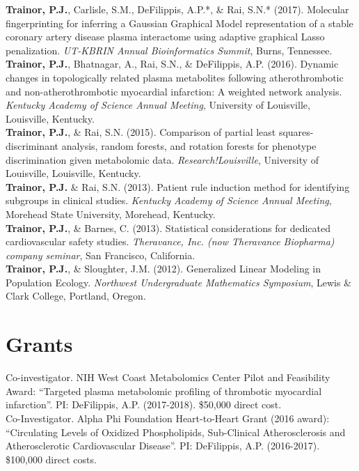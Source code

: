 {\textbf{Trainor, P.J.}, Carlisle, S.M., DeFilippis, A.P.*, \& Rai, S.N.* (2017). Molecular fingerprinting for inferring a Gaussian Graphical Model representation of a stable coronary artery disease plasma interactome using adaptive graphical Lasso penalization. \emph{UT-KBRIN Annual Bioinformatics Summit}, Burns, Tennessee.  \\ 

\textbf{Trainor, P.J.}, Bhatnagar, A., Rai, S.N., \& DeFilippis, A.P. (2016). Dynamic changes in topologically related plasma metabolites following atherothrombotic and non-atherothrombotic myocardial infarction: A weighted network analysis. \emph{Kentucky Academy of Science Annual Meeting}, University of Louisville, Louisville, Kentucky.  \\ 

\textbf{Trainor, P.J.}, \& Rai, S.N. (2015). Comparison of partial least squares-discriminant analysis, random forests, and rotation forests for phenotype discrimination given metabolomic data. \emph{Research!Louisville}, University of Louisville, Louisville, Kentucky.  \\ 

\textbf{Trainor, P.J.} \& Rai, S.N. (2013). Patient rule induction method for identifying subgroups in clinical studies. \emph{Kentucky Academy of Science Annual Meeting}, Morehead State University, Morehead, Kentucky. \\ 

\textbf{Trainor, P.J.}, \& Barnes, C. (2013). Statistical considerations for dedicated cardiovascular safety studies. \emph{Theravance, Inc. (now Theravance Biopharma) company seminar}, San Francisco, California. \\ 

\textbf{Trainor, P.J.}, \& Sloughter, J.M. (2012). Generalized Linear Modeling in Population Ecology. \emph{Northwest Undergraduate Mathematics Symposium}, Lewis \& Clark College, Portland, Oregon. 

\section*{Grants}
 Co-investigator. NIH West Coast Metabolomics Center Pilot and Feasibility Award: ``Targeted plasma metabolomic profiling of thrombotic myocardial infarction''. PI: DeFilippis, A.P. (2017-2018). \$50,000 direct cost. \\

 Co-Investigator. Alpha Phi Foundation Heart-to-Heart Grant (2016 award): ``Circulating Levels of Oxidized Phospholipids, Sub-Clinical Atherosclerosis and Atherosclerotic Cardiovascular Disease''. PI: DeFilippis, A.P. (2016-2017). \$100,000 direct costs. 

}
